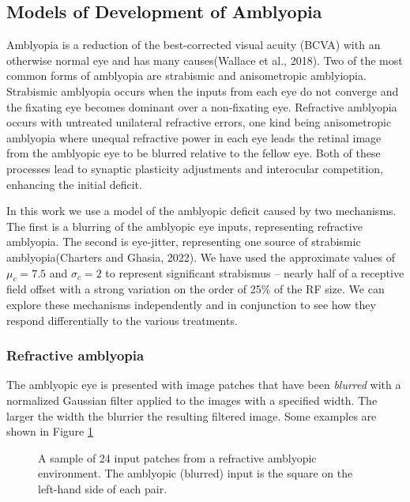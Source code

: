 \documentclass[
  onecolumn]{article}
\begin{document}
\hypertarget{models-of-development-of-amblyopia}{%
\subsection{Models of Development of
Amblyopia}\label{models-of-development-of-amblyopia}}

Amblyopia is a reduction of the best-corrected visual acuity (BCVA) with
an otherwise normal eye and has many causes(Wallace et al., 2018). Two
of the most common forms of amblyopia are strabismic and anisometropic
amblyiopia. Strabismic amblyopia occurs when the inputs from each eye do
not converge and the fixating eye becomes dominant over a non-fixating
eye. Refractive amblyopia occurs with untreated unilateral refractive
errors, one kind being anisometropic amblyopia where unequal refractive
power in each eye leads the retinal image from the amblyopic eye to be
blurred relative to the fellow eye. Both of these processes lead to
synaptic plasticity adjustments and interocular competition, enhancing
the initial deficit.

In this work we use a model of the amblyopic deficit caused by two
mechanisms. The first is a blurring of the amblyopic eye inputs,
representing refractive amblyopia. The second is eye-jitter,
representing one source of strabismic amblyopia(Charters and Ghasia,
2022). We have used the approximate values of \(\mu_c=7.5\) and
\(\sigma_c=2\) to represent significant strabismus -- nearly half of a
receptive field offset with a strong variation on the order of 25\% of
the RF size. We can explore these mechanisms independently and in
conjunction to see how they respond differentially to the various
treatments.

\hypertarget{refractive-amblyopia}{%
\subsubsection{Refractive amblyopia}\label{refractive-amblyopia}}

The amblyopic eye is presented with image patches that have been
\emph{blurred} with a normalized Gaussian filter applied to the images
with a specified width. The larger the width the blurrier the resulting
filtered image. Some examples are shown in Figure
\ref{fig:blurred-inputs}

\begin{figure}
\hypertarget{fig:blurred-inputs}{%
\centering

\caption{A sample of 24 input patches from a refractive amblyopic
environment. The amblyopic (blurred) input is the square on the
left-hand side of each pair.}\label{fig:blurred-inputs}
}
\end{figure}
\end{document}
